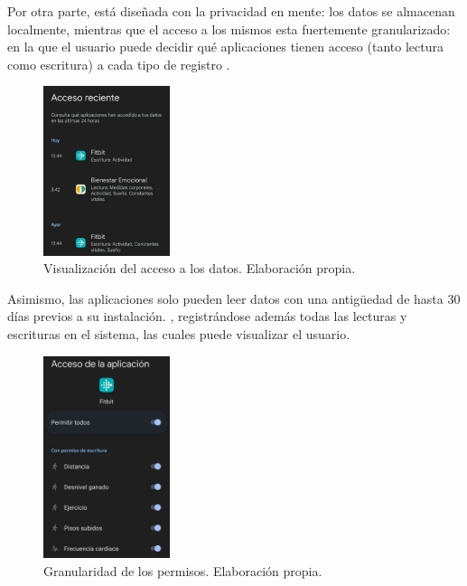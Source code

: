             Por otra parte, está diseñada con la privacidad en mente: los datos se almacenan localmente, mientras que el 
            acceso a los mismos esta fuertemente granularizado: en la que el usuario puede
            decidir qué aplicaciones tienen acceso (tanto lectura como escritura) a cada tipo de registro 
            \cite{saez_google_2022}.  
            
            \begin{figure}[h]
                \centering
                \includegraphics[width=0.33\textwidth]{figures/Health Connect acceso reciente.jpg}
                \caption[Visualización del acceso a los datos.]
                {Visualización del acceso a los datos. Elaboración propia.}
                \label{figure:health_connect:acceso_reciente}
            \end{figure}

            
            Asimismo, las aplicaciones solo pueden leer datos con una antigüedad de 
            hasta 30 días previos a su instalación. \cite{noauthor_preguntas_nodate}, registrándose además todas las 
            lecturas y escrituras en el sistema, las cuales puede visualizar el usuario. 

            \begin{figure}[h]
                \centering
                \includegraphics[width=0.33\textwidth]{figures/Health connect permisos fitbit.jpg}
                \caption[Granularidad de los permisos.]
                {Granularidad de los permisos. Elaboración propia.}
                \label{figure:health_connect:granularidad_permisos}
            \end{figure}

